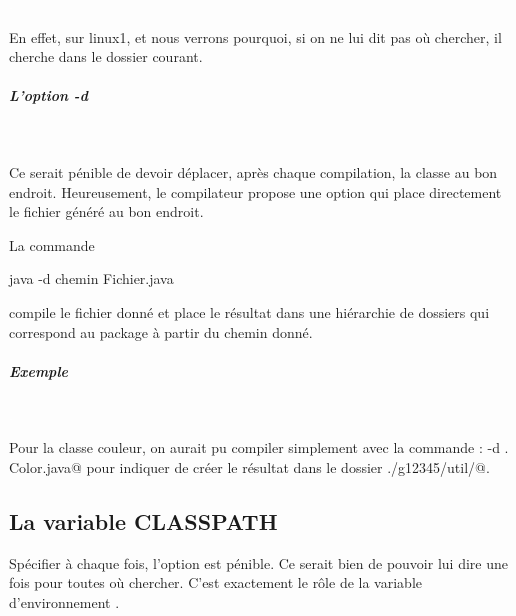 \documentclass[11pt,a4paper]{article}
\begin{document}
					\textcolor{white}{.} \par
				
            \par
        
			En effet, sur linux1, et nous verrons pourquoi,
			si on ne lui  dit pas o\`u chercher, 
			il cherche dans le dossier courant.
		
            \par
        
			
		\subparagraph{L'option -d} 
		
					\textcolor{white}{.} \par
				
            \par
        
			Ce serait p\'enible de devoir d\'eplacer,
			apr\`es chaque compilation,
			la classe au bon endroit.
			Heureusement, le compilateur propose une option
			qui place directement le fichier g\'en\'er\'e au bon endroit.
		
            \par
        
			La commande
		
            \par
        \begin{Java}
	java -d chemin Fichier.java
		\end{Java}
			compile le fichier donn\'e et place
			le r\'esultat dans une hi\'erarchie de dossiers
			qui correspond au package \`a partir du chemin donn\'e.
		
            \par
        
			
		\subparagraph{Exemple} 
		
					\textcolor{white}{.} \par
				
			Pour la classe couleur, 
			on aurait pu compiler simplement avec la commande :
			\verb@javac -d . Color.java@
			pour indiquer de cr\'eer le r\'esultat dans le dossier
			\verb@./g12345/util/@.
		
            \par
        \subsection{La variable CLASSPATH}
				Sp\'ecifier \`a chaque fois,
				l'option \verb@cp@
				est p\'enible.
				Ce serait bien de pouvoir lui dire une fois pour toutes
				o\`u chercher.
				C'est exactement le r\^ole de la variable d'environnement
				\verb@CLASSPATH@.
			
\end{document}
